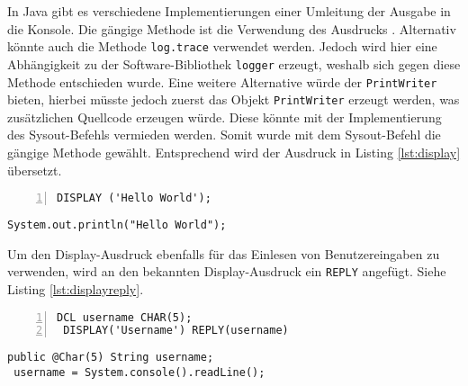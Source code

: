 In Java gibt es verschiedene Implementierungen einer Umleitung der Ausgabe in die Konsole.
Die gängige Methode ist die Verwendung des Ausdrucks . 
Alternativ könnte auch die Methode \verb+log.trace+ verwendet werden.
Jedoch wird hier eine Abhängigkeit zu der Software-Bibliothek \verb+logger+  erzeugt, weshalb sich gegen diese Methode entschieden wurde.
Eine weitere Alternative würde der \verb+PrintWriter+ bieten, hierbei müsste jedoch zuerst das Objekt \verb+PrintWriter+ erzeugt werden, was zusätzlichen Quellcode erzeugen würde. Diese könnte mit der Implementierung des Sysout-Befehls vermieden werden.
Somit wurde mit dem Sysout-Befehl die gängige Methode gewählt. Entsprechend wird der Ausdruck in Listing \ref{lst:display} übersetzt.

\begin{minipage}[b]{0.48\linewidth}
	\centering
	\lstset{language=PL/I,label=SliceExaple}
	\begin{lstlisting}[frame=single, numbers=left, mathescape,%
		caption={Transformation Standardausgabe}, label={lst:display}, basicstyle=\fontsize{9}{13}\selectfont\ttfamily]
 DISPLAY ('Hello World');
	\end{lstlisting}
\end{minipage}
\hspace{0.5cm}
\begin{minipage}[b]{0.48\linewidth}
	\centering
	\lstset{language=Java,label=SliceExaple}
	\begin{lstlisting}[frame=single, mathescape,%
		title={" "}, basicstyle=\fontsize{9}{13}\selectfont\ttfamily]
 System.out.println("Hello World");
	\end{lstlisting}
\end{minipage} 


Um den Display-Ausdruck ebenfalls für das Einlesen von Benutzereingaben zu verwenden, wird an den bekannten Display-Ausdruck ein \verb+REPLY+ angefügt. Siehe Listing \ref{lst:displayreply}.

\begin{minipage}[b]{0.48\linewidth}
	\centering
	\lstset{language=PL/I,label=SliceExaple}
	\begin{lstlisting}[frame=single, numbers=left, mathescape,%
		caption={Transformation Standardeingabe}, label={lst:displayreply}, basicstyle=\fontsize{9}{13}\selectfont\ttfamily]
 DCL username CHAR(5);
 DISPLAY('Username') REPLY(username)
	\end{lstlisting}
\end{minipage}
\hspace{0.5cm}
\begin{minipage}[b]{0.48\linewidth}
	\centering
	\lstset{language=Java,label=SliceExaple}
	\begin{lstlisting}[frame=single, mathescape,% 
		title={" "}, basicstyle=\fontsize{9}{13}\selectfont\ttfamily]
 public @Char(5) String username;
 username = System.console().readLine(); 
	\end{lstlisting}
\end{minipage} 

